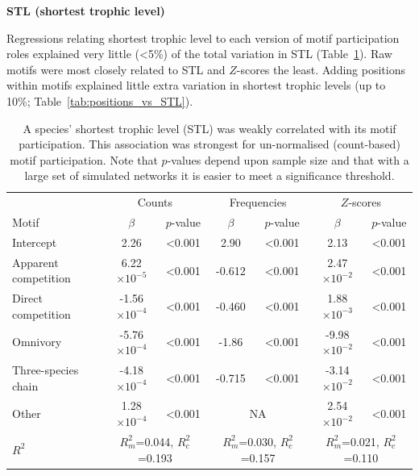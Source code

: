 \documentclass[12pt]{article}
\begin{document}
		\textbf{STL (shortest trophic level)}

			Regressions relating shortest trophic level to each version of motif participation roles explained very little (\textless5\%) of the total variation in STL (Table~\ref{tab:motifs_vs_STL}). 
			Raw motifs were most closely related to STL and $Z$-scores the least.
            Adding positions within motifs explained little extra variation in shortest trophic levels (up to 10\%; Table~\ref{tab:positions_vs_STL}).

			\begin{table}[hb!]
    			\caption{A species' shortest trophic level (STL) was weakly correlated with its motif participation. This association was strongest for un-normalised (count-based) motif participation. Note that $p$-values depend upon sample size and that with a large set of simulated networks it is easier to meet a significance threshold.}
    			\label{tab:motifs_vs_STL}
    			\begin{tabular}{l | c c | c c | c c}
    			& \multicolumn{2}{c|}{Counts} & \multicolumn{2}{c|}{Frequencies} & \multicolumn{2}{c}{$Z$-scores} \\
    			Motif & $\beta$ & $p$-value & $\beta$ & $p$-value & $\beta$ & $p$-value \\
    			\hline
    			Intercept & 2.26 & \textless0.001 & 2.90 & \textless0.001 & 2.13 & \textless0.001 \\
    			\hline
    			Apparent competition & 6.22$\times10^{-5}$ & \textless0.001 & -0.612 & \textless0.001 & 2.47$\times10^{-2}$ & \textless0.001 \\
    			Direct competition   & -1.56$\times10^{-4}$ & \textless0.001 & -0.460 & \textless0.001 & 1.88$\times10^{-3}$ & \textless0.001 \\
    			Omnivory       & -5.76$\times10^{-4}$ & \textless0.001 & -1.86 & \textless0.001 & -9.98$\times10^{-2}$ & \textless0.001 \\
    			Three-species chain  & -4.18$\times10^{-4}$ & \textless0.001 & -0.715 & \textless0.001 & -3.14$\times10^{-2}$ & \textless0.001 \\
    			Other    & 1.28$\times10^{-4}$ & \textless0.001 & \multicolumn{2}{c|}{NA} & 2.54$\times10^{-2}$ & \textless0.001 \\
    			\hline
    			$R^2$ & \multicolumn{2}{c|}{\tiny{$R^2_m$=0.044, $R^2_c$=0.193}} & 
    			\multicolumn{2}{c|}{\tiny{$R^2_m$=0.030, $R^2_c$=0.157}} & 
    			\multicolumn{2}{c}{\tiny{$R^2_m$=0.021, $R^2_c$=0.110}} \\
    			\end{tabular}
    			\end{table}
\end{document}
